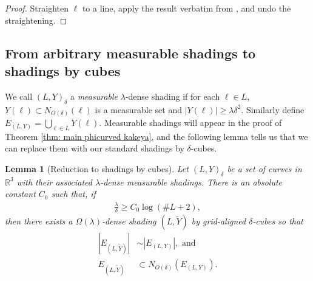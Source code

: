 \documentclass[12pt]{amsart}
\numberwithin{equation}{section}
\newtheorem{lemma}{Lemma}[section]
\newcommand{\R}{\mathbb{R}}
\newcommand{\1}{\mathbbm{1}}
\begin{document}
\begin{proof}
    Straighten $\ell$ to a line, apply the result verbatim from \cite[Lemma 2.7]{KWZ}, and undo the straightening. 
\end{proof}

\subsection{From arbitrary measurable shadings to shadings by cubes}
We call $(L,Y)_\delta$ a \emph{measurable} $\lambda$-dense shading if for each $\ell \in L$, $Y(\ell) \subset N_{O(\delta)}(\ell)$ is a measurable set and $|Y(\ell)| \geq \lambda \delta^2$. Similarly define $E_{(L,Y)} = \bigcup_{\ell \in L} Y(\ell)$.  Measurable shadings will appear in the proof of Theorem \ref{thm: main phicurved kakeya}, and the following lemma tells us that we can replace them with our standard shadings by $\delta$-cubes.

\begin{lemma}[Reduction to shadings by cubes]\label{lem: meas to cubes}
    Let $(L,Y)_\delta$ be a set of curves in $\R^3$ with their associated $\lambda$-dense measurable shadings. There is an absolute constant $C_0$ such that, if 
    \begin{align}\label{eq: nontrivial density assumption}
        \frac{\lambda}{\delta} \geq C_0 \log(\#L + 2),
    \end{align}
    then there exists a $\Omega(\lambda)$-dense shading $(L, \tilde Y)$ by grid-aligned $\delta$-cubes so that 
    \begin{align}
        |E_{(L,\tilde Y)}| &\sim |E_{(L,Y)}|, \text{ and } \label{eq: meas to cubes: same vol} \\
        E_{(L, \tilde Y)} &\subset N_{O(\delta)}(E_{(L,Y)}).\label{eq: meas to cubes: containment}
    \end{align}
\end{lemma}
\end{document}

